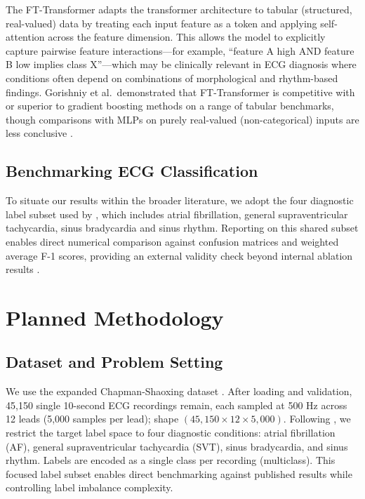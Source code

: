 \documentclass[10pt,twocolumn,letterpaper]{article}
\begin{document}
The FT-Transformer \cite{gorishniy_revisiting_2023} adapts the transformer architecture to tabular (structured, real-valued) data by treating each input feature as a token and applying self-attention across the feature dimension. This allows the model to explicitly capture pairwise feature interactions—for example, ``feature A high AND feature B low implies class X''—which may be clinically relevant in ECG diagnosis where conditions often depend on combinations of morphological and rhythm-based findings. Gorishniy et al.\ demonstrated that FT-Transformer is competitive with or superior to gradient boosting methods on a range of tabular benchmarks, though comparisons with MLPs on purely real-valued (non-categorical) inputs are less conclusive \cite{gorishniy_revisiting_2023}.

\subsection{Benchmarking ECG Classification}

To situate our results within the broader literature, we adopt the four diagnostic label subset used by \cite{zheng2022}, which includes atrial fibrillation, general supraventricular tachycardia, sinus bradycardia and sinus rhythm. Reporting on this shared subset enables direct numerical comparison against confusion matrices and weighted average F-1 scores, providing an external validity check beyond internal ablation results \cite{zheng2022}.


\section{Planned Methodology}

\subsection{Dataset and Problem Setting}

We use the expanded Chapman-Shaoxing dataset \cite{zheng2022}. After loading and validation, 45,150 single 10-second ECG recordings remain, each sampled at 500 Hz across 12 leads (5,000 samples per lead); shape $(45{,}150 \times 12 \times 5{,}000)$. Following \cite{zheng2022}, we restrict the target label space to four diagnostic conditions: atrial fibrillation (AF), general supraventricular tachycardia (SVT), sinus bradycardia, and sinus rhythm. Labels are encoded as a single class per recording (multiclass). This focused label subset enables direct benchmarking against published results while controlling label imbalance complexity.
\end{document}
